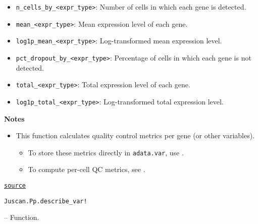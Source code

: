 \documentclass[oneside]{memoir}
\begin{document}
\begin{adjustwidth}{2em}{0pt}
\begin{itemize}
\begin{itemize}
\item \texttt{{\textquotedbl}n\_cells\_by\_<expr\_type>{\textquotedbl}}: Number of cells in which each gene is detected.


\item \texttt{{\textquotedbl}mean\_<expr\_type>{\textquotedbl}}: Mean expression level of each gene.


\item \texttt{{\textquotedbl}log1p\_mean\_<expr\_type>{\textquotedbl}}: Log-transformed mean expression level.


\item \texttt{{\textquotedbl}pct\_dropout\_by\_<expr\_type>{\textquotedbl}}: Percentage of cells in which each gene is not detected.


\item \texttt{{\textquotedbl}total\_<expr\_type>{\textquotedbl}}: Total expression level of each gene.


\item \texttt{{\textquotedbl}log1p\_total\_<expr\_type>{\textquotedbl}}: Log-transformed total expression level.

\end{itemize}
\end{itemize}
\textbf{Notes}

\begin{itemize}
\item This function calculates quality control metrics per gene (or other variables).  

\begin{itemize}
\item To store these metrics directly in \texttt{adata.var}, use .  


\item To compute per-cell QC metrics, see .

\end{itemize}
\end{itemize}


\href{https://github.com/zehua0417/Juscan.jl/blob/393ad1b827b678ea98a738f92af658ee9ed9a403/src/preprocessing/qc.jl#L374-L410}{\texttt{source}}


\end{adjustwidth}
\hypertarget{17655604818096302154}{\texttt{Juscan.Pp.describe\_var!}}  -- {Function.}
\end{document}
